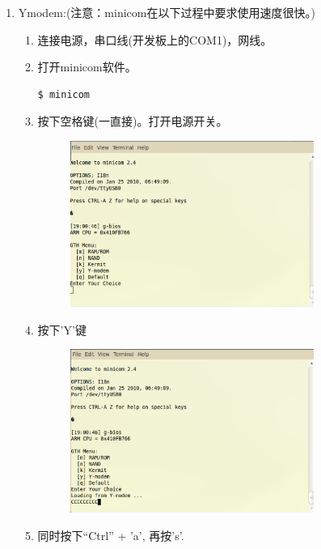 \begin{enumerate} \setlength{\itemsep}{-\itemsep}
\item Ymodem:(注意：minicom在以下过程中要求使用速度很快。)
	\begin{enumerate} \setlength{\itemsep}{-\itemsep}
	\item 连接电源，串口线(开发板上的COM1)，网线。
	\item 打开minicom软件。
	\begin{lstlisting}[language=c,numbers=none]
	$ minicom
	\end{lstlisting}
	\item 按下空格键(一直接)。打开电源开关。
	\begin{figure}[H]
	\centering
	\includegraphics[width=0.8\textwidth]{image/min_01.eps}
	\end{figure}
	\item 按下'Y'键
		\begin{figure}[H]
		\centering
		\includegraphics[width=0.8\textwidth]{image/min_02.eps}
		\end{figure}
	\item 同时按下``Ctrl'' + 'a', 再按's'.
		\begin{figure}[H]

\end{figure}
\end{enumerate}
\end{enumerate}

